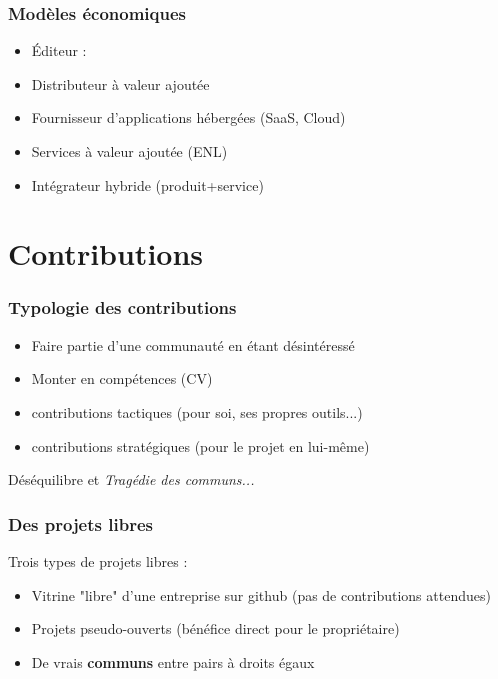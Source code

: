 \documentclass{beamer}
\begin{document}
\begin{frame}\frametitle{Modèles économiques}
  \begin{itemize}
  \item Éditeur : 
  \item Distributeur à valeur ajoutée 
  \item Fournisseur d'applications hébergées (SaaS, Cloud)
  \item Services à valeur ajoutée (ENL) 
  \item Intégrateur hybride (produit+service)
  \end{itemize}
  
\end{frame}

\section{Contributions}

\begin{frame}\frametitle{Typologie des contributions}

  \begin{itemize}
  \item Faire partie d'une communauté en étant désintéressé
  \item Monter en compétences (CV)
  \item contributions tactiques (pour soi, ses propres outils...)
  \item contributions stratégiques (pour le projet en lui-même)
  \end{itemize}

  Déséquilibre et \textit{Tragédie des communs...}

  
\end{frame}

\begin{frame}\frametitle{Des projets libres}
  Trois types de projets libres :
  \begin{itemize}
  \item Vitrine "libre" d'une entreprise sur github (pas de
    contributions attendues)
  \item Projets pseudo-ouverts (bénéfice direct pour le propriétaire)
  \item De vrais \textbf{communs} entre pairs à droits égaux
  \end{itemize}
\end{frame}
\end{document}

